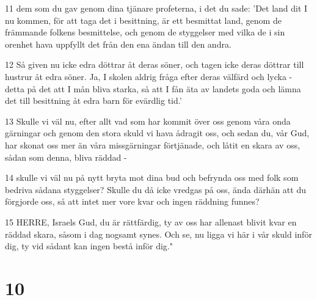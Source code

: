 \par 11 dem som du gav genom dina tjänare profeterna, i det du sade: 'Det land dit I nu kommen, för att taga det i besittning, är ett besmittat land, genom de främmande folkens besmittelse, och genom de styggelser med vilka de i sin orenhet hava uppfyllt det från den ena ändan till den andra.
\par 12 Så given nu icke edra döttrar åt deras söner, och tagen icke deras döttrar till hustrur åt edra söner. Ja, I skolen aldrig fråga efter deras välfärd och lycka - detta på det att I mån bliva starka, så att I fån äta av landets goda och lämna det till besittning åt edra barn för evärdlig tid.'
\par 13 Skulle vi väl nu, efter allt vad som har kommit över oss genom våra onda gärningar och genom den stora skuld vi hava ådragit oss, och sedan du, vår Gud, har skonat oss mer än våra missgärningar förtjänade, och låtit en skara av oss, sådan som denna, bliva räddad -
\par 14 skulle vi väl nu på nytt bryta mot dina bud och befrynda oss med folk som bedriva sådana styggelser? Skulle du då icke vredgas på oss, ända därhän att du förgjorde oss, så att intet mer vore kvar och ingen räddning funnes?
\par 15 HERRE, Israels Gud, du är rättfärdig, ty av oss har allenast blivit kvar en räddad skara, såsom i dag nogsamt synes. Och se, nu ligga vi här i vår skuld inför dig, ty vid sådant kan ingen bestå inför dig."

\chapter{10}

